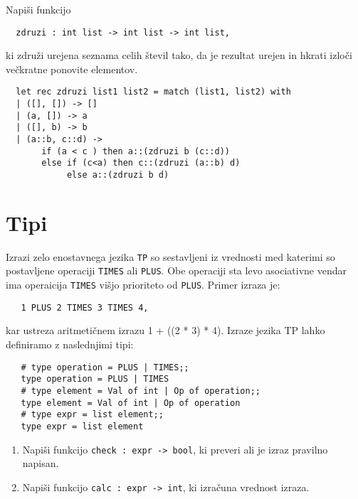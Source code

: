 \begin{ex}
  Napi\v si funkcijo

  \begin{verbatim}
  zdruzi : int list -> int list -> int list,
  \end{verbatim}

  ki zdru\v zi urejena seznama celih \v stevil tako, da je rezultat
  urejen in hkrati izlo\v ci ve\v ckratne ponovite elementov.


  \begin{sol}
  \begin{verbatim}
  let rec zdruzi list1 list2 = match (list1, list2) with
  | ([], []) -> []
  | (a, []) -> a
  | ([], b) -> b
  | (a::b, c::d) -> 
       if (a < c ) then a::(zdruzi b (c::d))
       else if (c<a) then c::(zdruzi (a::b) d)
            else a::(zdruzi b d)
  \end{verbatim}
  \end{sol}

\end{ex} 

\section{Tipi}

\begin{ex}
   Izrazi zelo enostavnega jezika \texttt{TP} so sestavljeni iz
   vrednosti med katerimi so postavljene operaciji \texttt{TIMES} ali
   \texttt{PLUS}. Obe operaciji sta levo asociativne vendar ima
   operaicija \texttt{TIMES} vi\v sjo prioriteto od
   \texttt{PLUS}. Primer izraza je:

   \begin{verbatim}
   1 PLUS 2 TIMES 3 TIMES 4,
   \end{verbatim}

   kar ustreza aritmeti\v cnem izrazu 1 + ((2 * 3) * 4). Izraze jezika
   TP lahko definiramo z naslednjimi tipi:
 
   \begin{verbatim}
   # type operation = PLUS | TIMES;; 
   type operation = PLUS | TIMES 
   # type element = Val of int | Op of operation;; 
   type element = Val of int | Op of operation
   # type expr = list element;;
   type expr = list element
   \end{verbatim}

   \begin{enumerate}[label=(\roman*)]
   \item Napi\v si funkcijo \texttt{check : expr -> bool}, ki preveri
     ali je izraz pravilno napisan.

   \item Napi\v si funkcijo \texttt{calc : expr -> int}, ki izra\v
     cuna vrednost izraza.
   \end{enumerate}


\end{ex}


